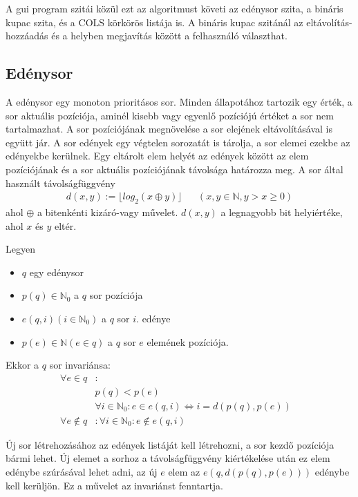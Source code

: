 A gui program szitái közül ezt az algoritmust követi az edénysor szita, a bináris kupac szita, és a COLS körkörös listája is. A bináris kupac szitánál az eltávolítás-hozzáadás és a helyben megjavítás között a felhasználó választhat.

\subsection{Edénysor}

A edénysor egy monoton prioritásos sor.
Minden állapotához tartozik egy érték, a sor aktuális pozíciója, aminél kisebb vagy egyenlő pozíciójú értéket a sor nem tartalmazhat.
A sor pozíciójának megnövelése a sor elejének eltávolításával is együtt jár.
A sor edények egy végtelen sorozatát is tárolja, a sor elemei ezekbe az edényekbe kerülnek.
Egy eltárolt elem helyét az edények között az elem pozíciójának és a sor aktuális pozíciójának távolsága határozza meg.
A sor által használt távolságfüggvény
\begin{align*}
d(x, y) := \lfloor log_{2}{}(x \oplus y) \rfloor & & (x, y \in \mathbb{N}, y > x \ge 0)
\end{align*}
ahol $\oplus$ a bitenkénti kizáró-vagy művelet. $d(x, y)$ a legnagyobb bit helyiértéke, ahol $x$ és $y$ eltér.

Legyen
\begin{itemize}
\item $q$ egy edénysor
\item $p(q) \in \mathbb{N}_0$ a $q$ sor pozíciója
\item $e(q, i) (i \in \mathbb{N}_0)$ a $q$ sor $i$. edénye
\item $p(e) \in \mathbb{N} (e \in q)$ a $q$ sor $e$ elemének pozíciója.
\end{itemize}
Ekkor a $q$ sor invariánsa:
\begin{align*}
\forall e \in q &: &\\ 
	& p(q) < p(e) \\
	& \forall i \in \mathbb{N}_0: e \in e(q, i) \iff i=d(p(q), p(e)) \\
\forall e \not\in q &: \forall i \in \mathbb{N}_0: e \not\in e(q, i)
\end{align*}

Új sor létrehozásához az edények listáját kell létrehozni, a sor kezdő pozíciója bármi lehet.
Új elemet a sorhoz a távolságfüggvény kiértékelése után ez elem edénybe szúrásával lehet adni,
az új $e$ elem az $e(q, d(p(q), p(e)))$ edénybe kell kerüljön. Ez a művelet az invariánst fenntartja.

